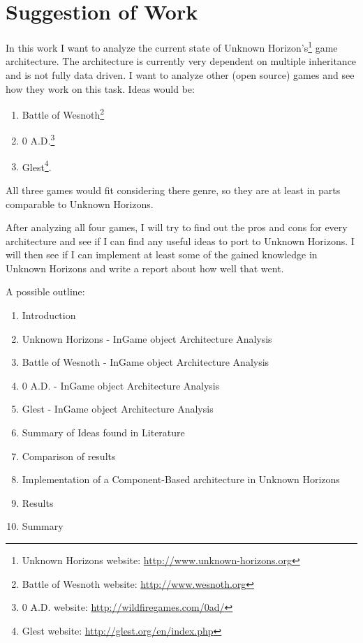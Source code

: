
\section{Suggestion of Work}
In this work I want to analyze the current state of Unknown Horizon's\footnote{Unknown Horizons website:
\url{http://www.unknown-horizons.org}} game architecture. The architecture is currently very dependent on
multiple inheritance and is not fully data driven. I want to analyze other (open source) games and see how they work on
this task. Ideas would be: 
\begin{enumerate}
	\item Battle of Wesnoth\footnote{Battle of Wesnoth website: \url{http://www.wesnoth.org}}
	\item 0 A.D.\footnote{0 A.D. website: \url{http://wildfiregames.com/0ad/}}
	\item Glest\footnote{Glest website: \url{http://glest.org/en/index.php}}.
\end{enumerate}

All three games would fit considering there genre, so they are at least in parts comparable to Unknown Horizons. 

After analyzing all four games, I will try to find out the pros and cons for every architecture and see if I can find
any useful ideas to port to Unknown Horizons. I will then see if I can implement at least some of the gained knowledge
in Unknown Horizons and write a report about how well that went.

A possible outline:
\begin{enumerate}
	\item Introduction
	\item Unknown Horizons - InGame object Architecture Analysis
	\item Battle of Wesnoth - InGame object Architecture Analysis
	\item 0 A.D. - InGame object Architecture Analysis
	\item Glest - InGame object Architecture Analysis
	\item Summary of Ideas found in Literature 
	\item Comparison of results
	\item Implementation of a Component-Based architecture in Unknown Horizons
	\item Results
	\item Summary
\end{enumerate}


